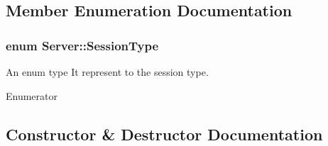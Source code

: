 \subsection{Member Enumeration Documentation}
\subsubsection[{\texorpdfstring{Session\+Type}{SessionType}}]{\setlength{\rightskip}{0pt plus 5cm}enum {\bf Server\+::\+Session\+Type}\hspace{0.3cm}{\ttfamily [private]}}\hypertarget{classServer_abb49932aed3c7683040e1a463e25c36c}{}\label{classServer_abb49932aed3c7683040e1a463e25c36c}
An enum type It represent to the session type. \begin{Desc}
\item[Enumerator]\par
\begin{description}
\item[{\em 
Rendering\hypertarget{classServer_abb49932aed3c7683040e1a463e25c36ca5927e9d71a6843a513199c25c2c62f82}{}\label{classServer_abb49932aed3c7683040e1a463e25c36ca5927e9d71a6843a513199c25c2c62f82}
}]\item[{\em 
Input\hypertarget{classServer_abb49932aed3c7683040e1a463e25c36cae387e75adf857bbe8390734f939efbdf}{}\label{classServer_abb49932aed3c7683040e1a463e25c36cae387e75adf857bbe8390734f939efbdf}
}]\end{description}
\end{Desc}


\subsection{Constructor \& Destructor Documentation}
